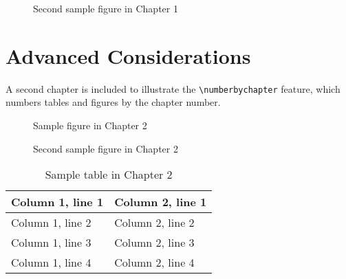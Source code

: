 \documentclass[dvips,11pt,twoside]{report}
\begin{document}
\begin{figure} \caption{Second sample figure in Chapter 1} \begin{center}
\end{center} \end{figure}

\chapter{Advanced Considerations}

A second chapter is included to illustrate the \verb+\numberbychapter+ feature,
which numbers tables and figures by the chapter number.

\begin{figure} \caption{Sample figure in Chapter 2} \begin{center}
\end{center} \end{figure}

\begin{figure} \caption{Second sample figure in Chapter 2} \begin{center}
\end{center} \end{figure}

\begin{table} \caption{Sample table in Chapter 2} \begin{center}
\begin{tabular}{|l|l|} \hline
Column 1, line 1 & Column 2, line 1 \\ \hline
Column 1, line 2 & Column 2, line 2 \\ \hline
Column 1, line 3 & Column 2, line 3 \\ \hline
Column 1, line 4 & Column 2, line 4 \\ \hline
\end{tabular} \end{center} \end{table}
\end{document}
